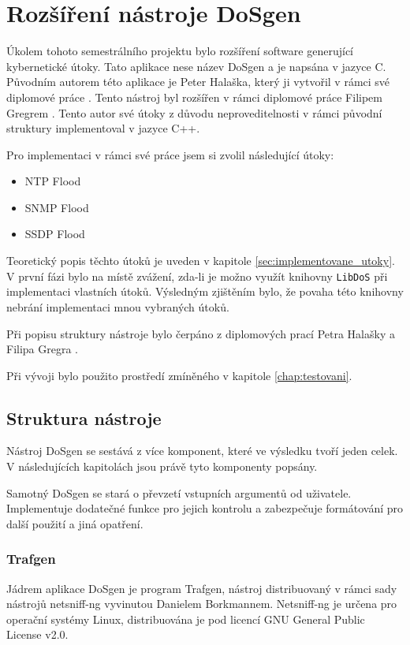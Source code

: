 \chapter{Rozšíření nástroje DoSgen}
Úkolem tohoto semestrálního projektu bylo rozšíření software generující kybernetické útoky. Tato aplikace nese název DoSgen a je napsána v jazyce C. Původním autorem této aplikace je Peter Halaška, který ji vytvořil v rámci své diplomové práce \cite{Halaska2016}. Tento nástroj byl rozšířen v rámci diplomové práce Filipem Gregrem \cite{Gregr2017}. Tento autor své útoky z důvodu neproveditelnosti v rámci původní struktury implementoval v jazyce C++.

Pro implementaci v rámci své práce jsem si zvolil následující útoky:
\begin{itemize}
	\item{NTP Flood}
	\item{SNMP Flood}
	\item{SSDP Flood}
\end{itemize}

Teoretický popis těchto útoků je uveden v kapitole \ref{sec:implementovane_utoky}. V první fázi bylo na místě zvážení, zda-li je možno využít knihovny \texttt{LibDoS} při implementaci vlastních útoků. Výsledným zjištěním bylo, že povaha této knihovny nebrání implementaci mnou vybraných útoků.

Při popisu struktury nástroje bylo čerpáno z diplomových prací Petra Halašky a Filipa Gregra \cite{Gregr2017}.

Při vývoji bylo použito prostředí zmíněného v kapitole \ref{chap:testovani}.

\section{Struktura nástroje}
Nástroj DoSgen se sestává z více komponent, které ve výsledku tvoří jeden celek. V následujících kapitolách jsou právě tyto komponenty popsány.

Samotný DoSgen se stará o převzetí vstupních argumentů od uživatele. Implementuje dodatečné funkce pro jejich kontrolu a zabezpečuje formátování pro další použití a jiná opatření.

\subsection{Trafgen}
Jádrem aplikace DoSgen je program Trafgen, nástroj distribuovaný v rámci sady nástrojů netsniff-ng vyvinutou Danielem Borkmannem. Netsniff-ng je určena pro operační systémy Linux, distribuována je pod licencí GNU General Public License v2.0.

